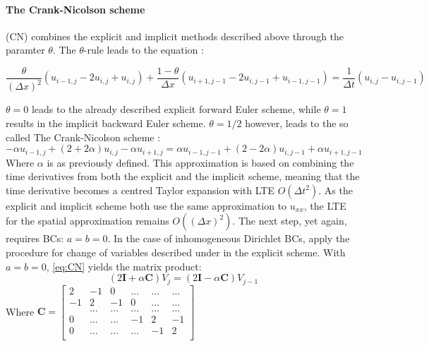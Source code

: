 \documentclass[%
oneside,                 %
final,                   %
10pt]{article}
\begin{document}
\paragraph{The Crank-Nicolson scheme} (CN) combines the explicit and implicit methods described above through  the paramter $\theta$. The $\theta$-rule leads to the equation \cite[p.310]{HJ15}: 

\begin{equation}
\frac{\theta}{(\Delta x)^2}(u_{i-1,j}-2u_{i,j}+u_{i,j})+\frac{1-\theta}{\Delta x}(u_{i+1,j-1}-2u_{i,j-1}+u_{i-1,j-1})=\frac{1}{\Delta t}(u_{i,j}-u_{i,j-1})
\label{eq:thetarule}
\end{equation}

$\theta=0$ leads to the already described explicit forward Euler scheme, while $\theta=1$ results in the implicit backward Euler scheme. $\theta=1/2$ however, leads to the so called The Crank-Nicolson scheme \cite[p.311]{HJ15}:
\begin{equation}
-\alpha u_{i-1,j}+(2+2\alpha)u_{i,j} - \alpha u_{i+1,j}=\alpha u_{i-1,j-1}+(2-2\alpha)u_{i,j-1}+\alpha u_{i+1,j-1}
\label{eq:CN}
\end{equation}
Where $\alpha$ is as previously defined. This approximation is based on combining the time derivatives from both the explicit and the implicit scheme, meaning that the time derivative becomes a centred Taylor expansion with LTE $O(\Delta t^2)$. As the explicit and implicit scheme both use the same approximation to $u_{xx}$, the LTE for the spatial approximation remains $O((\Delta x)^2)$. \newline
The next step, yet again, requires BCs: $a=b=0$.  In the case of inhomogeneous Dirichlet BCs, apply the procedure for change of variables described under in the explicit scheme. With $a=b=0$,  \eqref{eq:CN} yields the matrix product:
\begin{equation}
(2 \mathbf{I}+\alpha \mathbf{C})V_j= (2\mathbf{I}-\alpha \mathbf{C})V_{j-1}
\end{equation}
Where $\mathbf{C} = \begin{bmatrix}
                      		2& -1 & 0 &\dots   & \dots &\dots  \\
                           -1 & 2 & -1 &0 &\dots &\dots \\
                           & \dots & \dots& \dots& \dots & \dots     \\
                           0&  \dots & \dots &-1  &2& -1  \\
                           0&  \dots  &\dots  &\dots  &-1 & 2  \\
                      \end{bmatrix}$
\end{document}
